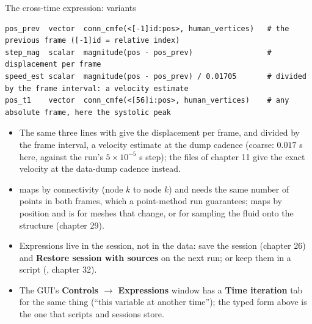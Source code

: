\documentclass[aspectratio=169,11pt]{beamer}
\newcommand{\gui}[1]{\textsf{\textbf{#1}}}
\begin{document}
\begin{frame}[fragile]{The cross-time expression: variants}
\label{fr:cmfe2}
\footnotesize
\begin{lstlisting}[style=tiny]
pos_prev  vector  conn_cmfe(<[-1]id:pos>, human_vertices)   # the previous frame ([-1]id = relative index)
step_mag  scalar  magnitude(pos - pos_prev)                 # displacement per frame
speed_est scalar  magnitude(pos - pos_prev) / 0.01705       # divided by the frame interval: a velocity estimate
pos_t1    vector  conn_cmfe(<[56]i:pos>, human_vertices)    # any absolute frame, here the systolic peak
\end{lstlisting}
\begin{itemize}
  \item The same three lines with  give the displacement per frame, and divided by the frame interval, a velocity estimate at the dump cadence (coarse: $0.017$ s here, against the run's $5 \times 10^{-5}$ s step); the  files of chapter 11 give the exact velocity at the data-dump cadence instead.
  \item {} maps by connectivity (node $k$ to node $k$) and needs the same number of points in both frames, which a point-method run guarantees;  maps by position and is for meshes that change, or for sampling the fluid onto the structure (chapter 29).
  \item Expressions live in the session, not in the data: save the session (chapter 26) and \gui{Restore session with sources} on the next run; or keep them in a script (, chapter 32).
  \item The GUI's \gui{Controls $\to$ Expressions} window has a \gui{Time iteration} tab for the same thing (``this variable at another time''); the typed form above is the one that scripts and sessions store.
\end{itemize}
\end{frame}
\end{document}
